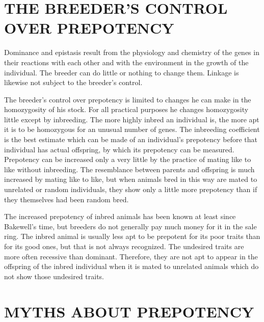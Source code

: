 \section*{THE BREEDER'S CONTROL OVER PREPOTENCY}

Dominance and epistasis result from the physiology and chemistry
of the genes in their reactions with each other and with the environment
in the growth of the individual. The breeder can do little or
nothing to change them. Linkage is likewise not subject to the breeder's
control.

The breeder's control over prepotency is limited to changes he can
make in the homozygosity of his stock. For all practical purposes he
changes homozygosity little except by inbreeding. The more highly
inbred an individual is, the more apt it is to be homozygous for an
unusual number of genes. The inbreeding coefficient is the best estimate
which can be made of an individual's prepotency before that
individual has actual offspring, by which its prepotency can be measured.
Prepotency can be increased only a very little by the practice of
mating like to like without inbreeding. The resemblance between parents
and offspring is much increased by mating like to like, but when
animals bred in this way are mated to unrelated or random individuals,
they show only a little more prepotency than if they themselves had
been random bred.

The increased prepotency of inbred animals has been known at least
since Bakewell's time, but breeders do not generally pay much money
for it in the sale ring. The inbred animal is usually less apt to be prepotent
for its poor traits than for its good ones, but that is not always
recognized. The undesired traits are more often recessive than dominant.
Therefore, they are not apt to appear in the offspring of the
inbred individual when it is mated to unrelated animals which do not
show those undesired traits.

\section*{MYTHS ABOUT PREPOTENCY}

